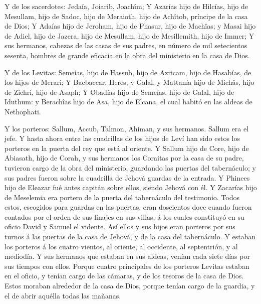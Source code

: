  Y de los sacerdotes: Jedaía, Joiarib, Joachîm;
 Y Azarías hijo de Hilcías, hijo de Mesullam, hijo de
Sadoc, hijo de Meraioth, hijo de Achîtob, príncipe de la casa de Dios;
 Y Adaías hijo de Jeroham, hijo de Phasur, hijo de Machîas;
y Masai hijo de Adiel, hijo de Jazera, hijo de Mesullam, hijo de
Mesillemith, hijo de Immer;  Y sus hermanos, cabezas de las
casas de sus padres, en número de mil setecientos sesenta, hombres de
grande eficacia en la obra del ministerio en la casa de Dios.

 Y de los Levitas: Semeías, hijo de Hassub, hijo de
Azricam, hijo de Hasabías, de los hijos de Merari;  Y
Bacbaccar, Heres, y Galal, y Mattanía hijo de Michâs, hijo de Zichri,
hijo de Asaph;  Y Obadías hijo de Semeías, hijo de Galal,
hijo de Iduthum: y Berachîas hijo de Asa, hijo de Elcana, el cual habitó
en las aldeas de Nethophati.

 Y los porteros: Sallum, Accub, Talmon, Ahiman, y sus
hermanos. Sallum era el jefe.  Y hasta ahora entre las
cuadrillas de los hijos de Leví han sido estos los porteros en la puerta
del rey que está al oriente.  Y Sallum hijo de Core, hijo
de Abiasath, hijo de Corah, y sus hermanos los Coraitas por la casa de
su padre, tuvieron cargo de la obra del ministerio, guardando las
puertas del tabernáculo; y sus padres fueron sobre la cuadrilla de
Jehová guardas de la entrada.  Y Phinees hijo de Eleazar
fué antes capitán sobre ellos, siendo Jehová con él.  Y
Zacarías hijo de Meselemia era portero de la puerta del tabernáculo del
testimonio.  Todos estos, escogidos para guardas en las
puertas, eran doscientos doce cuando fueron contados por el orden de sus
linajes en sus villas, á los cuales constituyó en su oficio David y
Samuel el vidente.  Así ellos y sus hijos eran porteros por
sus turnos á las puertas de la casa de Jehová, y de la casa del
tabernáculo.  Y estaban los porteros á los cuatro vientos,
al oriente, al occidente, al septentrión, y al mediodía.  Y
sus hermanos que estaban en sus aldeas, venían cada siete días por sus
tiempos con ellos.  Porque cuatro principales de los
porteros Levitas estaban en el oficio, y tenían cargo de las cámaras, y
de los tesoros de la casa de Dios.  Estos moraban alrededor
de la casa de Dios, porque tenían cargo de la guardia, y el de abrir
aquélla todas las mañanas.

